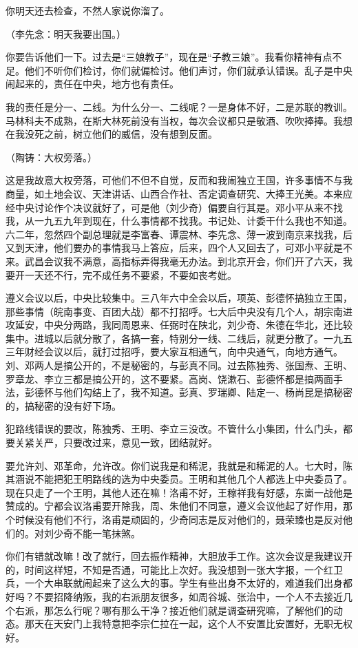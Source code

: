 你明天还去检查，不然人家说你溜了。

（李先念：明天我要出国。）

你要告诉他们一下。过去是“三娘教子”，现在是“子教三娘”。我看你精神有点不足。他们不听你们检讨，你们就偏检讨。他们声讨，你们就承认错误。乱子是中央闹起来的，责任在中央，地方也有责任。

我的责任是分一、二线。为什么分一、二线呢？一是身体不好，二是苏联的教训。马林科夫不成熟，在斯大林死前没有当权，每次会议都只是敬酒、吹吹捧捧。我想在我没死之前，树立他们的威信，没有想到反面。

（陶铸：大权旁落。）

这是我故意大权旁落，可他们不但不自觉，反而和我闹独立王国，许多事情不与我商量，如土地会议、天津讲话、山西合作社、否定调查研究、大捧王光美。本来应经中央讨论作个决议就好了，可是他（刘少奇）偏要自行其是。邓小平从来不找我，从一九五九年到现在，什么事情都不找我。书记处、计委干什么我也不知道。六二年，忽然四个副总理就是李富春、谭震林、李先念、薄一波到南京来找我，后又到天津，他们要办的事情我马上答应，后来，四个人又回去了，可邓小平就是不来。武昌会议我不满意，高指标弄得我毫无办法。到北京开会，你们开了六天，我要开一天还不行，完不成任务不要紧，不要如丧考妣。

遵义会议以后，中央比较集中。三八年六中全会以后，项英、彭德怀搞独立王国，那些事情（皖南事变、百团大战）都不打招呼。七大后中央没有几个人，胡宗南进攻延安，中央分两路，我同周恩来、任弼时在陕北，刘少奇、朱德在华北，还比较集中。进城以后就分散了，各搞一套，特别分一线、二线后，就更分散了。一九五三年财经会议以后，就打过招呼，要大家互相通气，向中央通气，向地方通气。刘、邓两人是搞公开的，不是秘密的，与彭真不同。过去陈独秀、张国焘、王明、罗章龙、李立三都是搞公开的，这不要紧。高岗、饶漱石、彭德怀都是搞两面手法，彭德怀与他们勾结上了，我不知道。彭真、罗瑞卿、陆定一、杨尚昆是搞秘密的，搞秘密的没有好下场。

犯路线错误的要改，陈独秀、王明、李立三没改。不管什么小集团，什么门头，都要关紧关严，只要改过来，意见一致，团结就好。

要允许刘、邓革命，允许改。你们说我是和稀泥，我就是和稀泥的人。七大时，陈其涵说不能把犯王明路线的选为中央委员。王明和其他几个人都选上中央委员了。现在只走了一个王明，其他人还在嘛！洛甫不好，王稼祥我有好感，东崮一战他是赞成的。宁都会议洛甫要开除我，周、朱他们不同意，遵义会议他起了好作用，那个时候没有他们不行，洛甫是顽固的，少奇同志是反对他们的，聂荣臻也是反对他们的。对刘少奇不能一笔抹煞。

你们有错就改嘛！改了就行，回去振作精神，大胆放手工作。这次会议是我建议开的，时间这样短，不知是否通，可能比上次好。我没想到一张大字报，一个红卫兵，一个大串联就闹起来了这么大的事。学生有些出身不太好的，难道我们出身都好吗？不要招降纳叛，我的右派朋友很多，如周谷城、张治中，一个人不去接近几个右派，那怎么行呢？哪有那么干净？接近他们就是调查研究嘛，了解他们的动态。那天在天安门上我特意把李宗仁拉在一起，这个人不安置比安置好，无职无权好。

